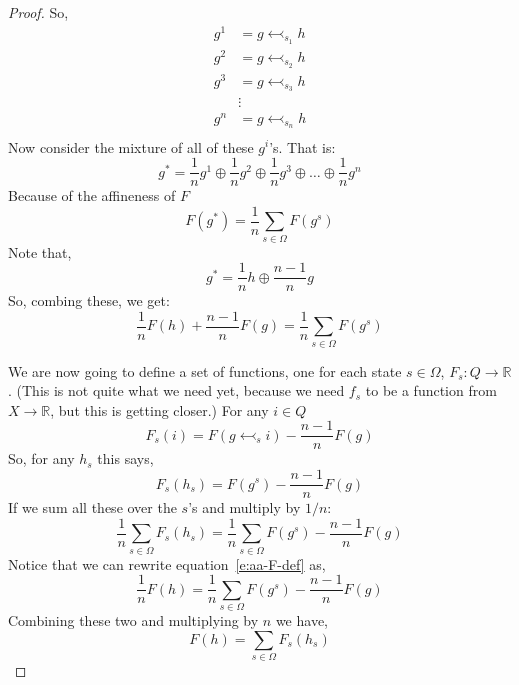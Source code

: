 \begin{proof}
So, 
\begin{align*}
    g^1 &= g \leftarrowtail_{s_1} h \\
    g^2 &= g \leftarrowtail_{s_2} h\\
    g^3 &= g \leftarrowtail_{s_3} h\\
        & \vdots \\
    g^n &= g \leftarrowtail_{s_n} h\\
\end{align*}
Now consider the mixture of all of these $g^i$'s.  That is:
\begin{equation*}
    g^* = \frac{1}{n} g^1 \oplus \frac{1}{n} g^2 \oplus \frac{1}{n} g^3 \oplus \dots \oplus \frac{1}{n} g^n
\end{equation*}
Because of the affineness of $F$
\begin{equation*}
F(g^*) = \frac{1}{n} \sum_{s \in \Omega} F(g^s)
\end{equation*}
Note that,
\begin{equation*}
    g^* = \frac{1}{n} h \oplus \frac{n-1}{n} g
\end{equation*}
So, combing these, we get:
\begin{equation}
\label{e:aa-F-def}
\frac{1}{n} F(h) + \frac{n-1}{n} F(g) = \frac{1}{n} \sum_{s \in \Omega} F(g^s)
\end{equation}

We are now going to define a set of functions, one for each state $s \in \Omega$, $F_s: Q \to \mathbb{R}$.  (This is not quite what we need yet, because we need $f_s$ to be a function from $X \to \mathbb{R}$, but this is getting closer.)  For any $i \in Q$
\begin{equation*}
F_s(i) = F(g \leftarrowtail_s i ) - \frac{n-1}{n} F(g)
\end{equation*}
So, for any $h_s$ this says,
\begin{equation*}
F_s(h_s) = F(g^s) - \frac{n-1}{n} F(g)
\end{equation*}
If we sum all these over the $s$'s and multiply by $1/n$:
\begin{equation*}
\frac{1}{n} \sum_{s \in \Omega} F_s(h_s) = \frac{1}{n} \sum_{s \in \Omega} F(g^s) - \frac{n-1}{n} F(g)
\end{equation*}
Notice that we can rewrite equation~\ref{e:aa-F-def} as,
\begin{equation*}
    \frac{1}{n} F(h) = \frac{1}{n} \sum_{s \in \Omega} F(g^s) - \frac{n-1}{n} F(g) 
\end{equation*}
Combining these two and multiplying by $n$ we have,
\begin{equation}
    \label{e:aa-Fs}
     F(h) = \sum_{s \in \Omega} F_s(h_s)
\end{equation}


\end{proof}
